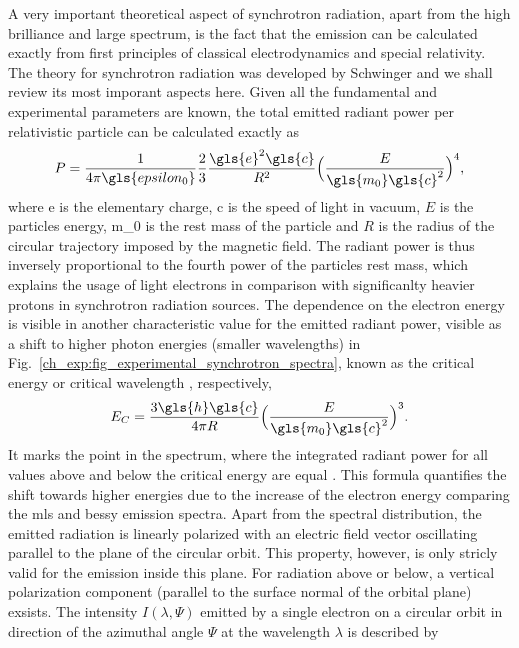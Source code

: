 A very important theoretical aspect of synchrotron radiation, apart from the high brilliance and large spectrum, is the fact that the emission can be calculated exactly from first principles of classical electrodynamics and special relativity. The theory for synchrotron radiation was developed by Schwinger \cite{schwinger_classical_1949} and we shall review its most imporant aspects here. Given all the fundamental and experimental parameters are known, the total emitted radiant power per relativistic particle can be calculated exactly as
\begin{align}
 P = \frac{1}{4 \pi \gls{epsilon_0}} \frac{2}{3} \frac{\gls{e}^2 \gls{c}}{R^2}\Big( \frac{E}{\gls{m_0} \gls{c}^2}\Big)^4 \text{,} \label{ch_exp:schwinger_equation_total_power}
\end{align}
where \gls{e} is the elementary charge, \gls{c} is the speed of light in vacuum, $E$ is the particles energy, \gls{m_0} is the rest mass of the particle and $R$ is the radius of the circular trajectory imposed by the magnetic field. The radiant power is thus inversely proportional to the fourth power of the particles rest mass, which explains the usage of light electrons in comparison with significanlty heavier protons in synchrotron radiation sources. The dependence on the electron energy is visible in another characteristic value for the emitted radiant power, visible as a shift to higher photon energies (smaller wavelengths) in Fig.~\ref{ch_exp:fig_experimental_synchrotron_spectra}, known as the critical energy or critical wavelength \cite{schwinger_classical_1949}, respectively,
\begin{align}
 E_C = \frac{3 \gls{h} \gls{c}}{4 \pi R} \Big( \frac{E}{\gls{m_0} \gls{c}^2}\Big)^3 \text{.} \label{ch_exp:characteristic_energy}
\end{align}
It marks the point in the spectrum, where the integrated radiant power for all values above and below the critical energy are equal \cite{balerna_introduction_2015}. This formula quantifies the shift towards higher energies due to the increase of the electron energy comparing the \gls{mls} and \gls{bessy} emission spectra. Apart from the spectral distribution, the emitted radiation is linearly polarized with an electric field vector oscillating parallel to the plane of the circular orbit. This property, however, is only stricly valid for the emission inside this plane. For radiation above or below, a vertical polarization component (parallel to the surface normal of the orbital plane) exsists. The intensity $I(\lambda,\Psi)$ emitted by a single electron on a circular orbit in direction of the azimuthal angle $\Psi$ at the wavelength $\lambda$ is described by
